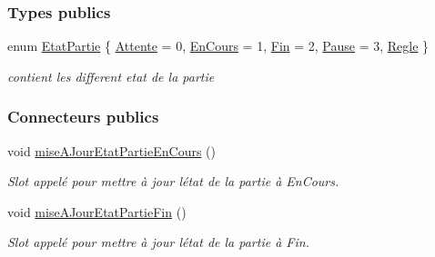 \subsubsection*{Types publics}
\begin{DoxyCompactItemize}
\item 
enum \hyperlink{class_communication_aaa8ce2e87a389c88f4f9a2f07b66ebdd}{Etat\+Partie} \{ \newline
\hyperlink{class_communication_aaa8ce2e87a389c88f4f9a2f07b66ebdda1c2ad067e6861802f9f48fe30001f4dc}{Attente} = 0, 
\hyperlink{class_communication_aaa8ce2e87a389c88f4f9a2f07b66ebdda46965d82c1659dbd82d6b69aad687e54}{En\+Cours} = 1, 
\hyperlink{class_communication_aaa8ce2e87a389c88f4f9a2f07b66ebddafa4e2a4dbf887d1384efe5432e17d57f}{Fin} = 2, 
\hyperlink{class_communication_aaa8ce2e87a389c88f4f9a2f07b66ebddae5ff9fbf58fec2640ed18150aa660bd1}{Pause} = 3, 
\newline
\hyperlink{class_communication_aaa8ce2e87a389c88f4f9a2f07b66ebdda340ac4e51b04541499e50164be9d4d9f}{Regle}
 \}\begin{DoxyCompactList}\small\item\em contient les different etat de la partie \end{DoxyCompactList}
\end{DoxyCompactItemize}
\subsubsection*{Connecteurs publics}
\begin{DoxyCompactItemize}
\item 
void \hyperlink{class_communication_a1f90de1ff5f98de887b9c77664e105c7}{mise\+A\+Jour\+Etat\+Partie\+En\+Cours} ()
\begin{DoxyCompactList}\small\item\em Slot appelé pour mettre à jour l\textquotesingle{}état de la partie à En\+Cours. \end{DoxyCompactList}\item 
void \hyperlink{class_communication_af6b9f4bf3b1df197ce20dccd9b78663f}{mise\+A\+Jour\+Etat\+Partie\+Fin} ()
\begin{DoxyCompactList}\small\item\em Slot appelé pour mettre à jour l\textquotesingle{}état de la partie à Fin. \end{DoxyCompactList}\end{DoxyCompactItemize}
